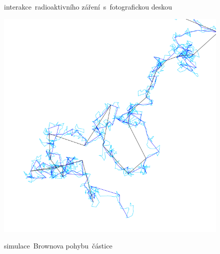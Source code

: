 \documentclass{../../../../style/mkimain}
\begin{document}
\begin{figure}[H]
    \begin{center}
        interakce~radioaktivního záření~s~fotografickou deskou
      \end{center}
  \endminipage\hfill
    \includegraphics[width=\linewidth]{images/brownuv-pohyb.png}
    \begin{center}
        simulace~Brownova pohybu~částice
    \end{center}
  \endminipage
\end{figure}
\vspace{0.5cm}
\end{document}
